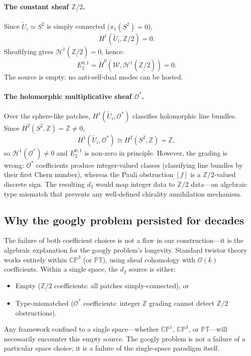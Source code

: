 \documentclass[11pt,a4paper]{article}
\theoremstyle{remark}
\newcommand{\PT}{\mathbb{PT}}
\newcommand{\CP}{\mathbb{CP}}
\newcommand{\Z}{\mathbb{Z}}
\newcommand{\cO}{\mathcal{O}}
\begin{document}
\paragraph{The constant sheaf $\underline{\Z/2}$.}
Since $\tilde{U}_i \simeq S^2$ is simply connected ($\pi_1(S^2) = 0$),
\[
H^1(\tilde{U}_i, \Z/2) = 0.
\]
Sheafifying gives $\mathcal{H}^1(\underline{\Z/2}) = 0$, hence:
\[
E_2^{0,1} = \check{H}^0(\mathcal{W}, \mathcal{H}^1(\underline{\Z/2})) = 0.
\]
The source is empty: no anti-self-dual modes can be hosted.

\paragraph{The holomorphic multiplicative sheaf $\cO^*$.}
Over the sphere-like patches, $H^1(\tilde{U}_i, \cO^*)$ classifies
holomorphic line bundles. Since $H^2(S^2, \Z) = \Z \neq 0$,
\[
H^1(\tilde{U}_i, \cO^*) \cong H^2(S^2, \Z) = \Z,
\]
so $\mathcal{H}^1(\cO^*) \neq 0$ and $E_2^{0,1}$ is non-zero in
principle. However, the grading is wrong: $\cO^*$ coefficients
produce integer-valued classes (classifying line bundles by their
first Chern number), whereas the Pauli obstruction $[f]$ is a
$\Z/2$-valued discrete sign.  The resulting $d_2$ would map integer
data to $\Z/2$ data---an algebraic type mismatch that prevents any
well-defined chirality annihilation mechanism.

\subsection{Why the googly problem persisted for decades}

The failure of both coefficient choices is not a flaw in our
construction---it is the algebraic explanation for the googly
problem's longevity. Standard twistor theory works entirely within
$\CP^3$ (or $\PT$), using sheaf cohomology with $\cO(k)$
coefficients. Within a single space, the $d_2$ source is either:
\begin{itemize}
  \item Empty ($\underline{\Z/2}$ coefficients: all patches
    simply-connected), or
  \item Type-mismatched ($\cO^*$ coefficients: integer $\Z$ grading
    cannot detect $\Z/2$ obstructions).
\end{itemize}
Any framework confined to a single space---whether $\CP^1$, $\CP^3$,
or $\PT$---will necessarily encounter this empty source. The googly
problem is not a failure of a particular space choice; it is a
failure of the single-space paradigm itself.
\end{document}
